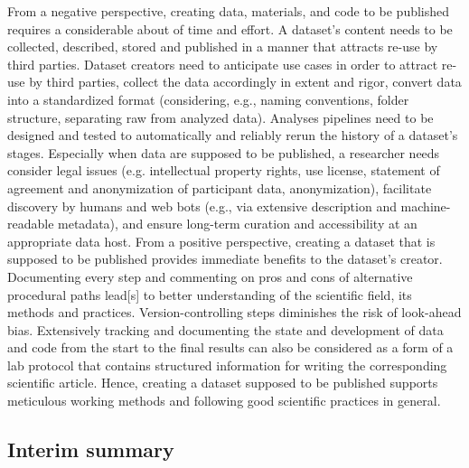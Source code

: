 From a negative perspective, creating data, materials, and code to be published
requires a considerable about of time and effort.
%
A dataset's content needs to be collected, described, stored and published in a
manner that attracts re-use by third parties.
%
Dataset creators need to anticipate use cases in order to attract re-use by
third parties, collect the data accordingly in extent and rigor, convert data
into a standardized format (considering, e.g., naming conventions, folder
structure, separating raw from analyzed data).
%
Analyses pipelines need to be designed and tested to automatically and reliably
rerun the history of a dataset's stages.
Especially when data are supposed to be published, a researcher needs consider
legal issues (e.g. intellectual property rights, use license, statement of
agreement and anonymization of participant data, anonymization), facilitate
discovery by humans and web bots (e.g., via extensive description and
machine-readable metadata), and ensure long-term curation and accessibility at
an appropriate data host.
%
From a positive perspective, creating a dataset that is supposed to be published
provides immediate benefits to the dataset's creator.
%
Documenting every step and commenting on pros and cons of alternative procedural
paths lead[s] to better understanding of the scientific field, its methods and
practices.
%
Version-controlling steps diminishes the risk of look-ahead bias.
%
Extensively tracking and documenting the state and development of data and code
from the start to the final results can also be considered as a form of a lab
protocol that contains structured information for writing the corresponding
scientific article.
%
Hence, creating a dataset supposed to be published supports meticulous working
methods and following good scientific practices in general.


\subsection{Interim summary}




